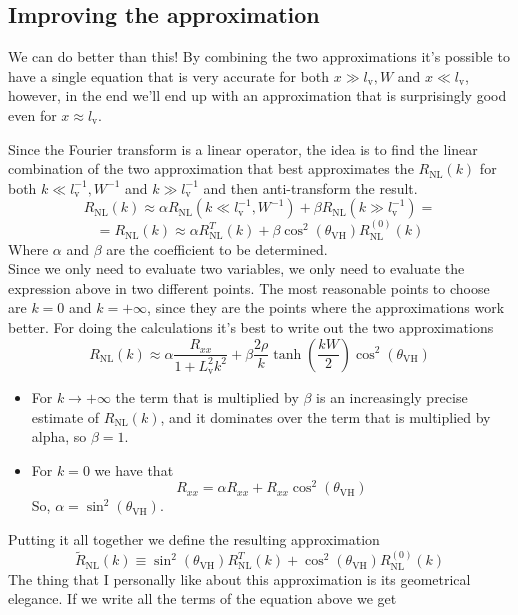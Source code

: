 \subsection{Improving the approximation}
We can do better than this! By combining the two approximations it's possible to have a single equation that is very accurate for both $x\gg l_\textrm{v},W$ and $x\ll l_\textrm{v}$, however, in the end we'll end up with an approximation that is surprisingly good even for  $x\approx l_\textrm{v}$.

Since the Fourier transform is a linear operator, the idea is to find the linear combination of the two approximation that best approximates the $R_{\textrm{NL}}(k)$ for both $k\ll l_\textrm{v}^{-1},W^{-1}$ and $k\gg l_\textrm{v}^{-1}$ and then anti-transform the result.
\[
    R_{\textrm{NL}}(k)\approx \alpha R_{\textrm{NL}}(k\ll l_\textrm{v}^{-1},W^{-1}) +\beta R_{\textrm{NL}}(k\gg l_\textrm{v}^{-1})=
\]
\[
    =R_{\textrm{NL}}(k)\approx \alpha R_{\textrm{NL}}^T(k) +\beta\cos^2(\theta_{\textrm{VH}}) R_{\textrm{NL}}^{(0)}(k)      
\]
Where $\alpha$ and $\beta$ are the coefficient to be determined.\\
Since we only need to evaluate two variables, we only need to evaluate the expression above in two different points. The most reasonable points to choose are $k=0$ and $k=+\infty$, since they are the points where the approximations work better. For doing the calculations it's best to write out the two approximations 
\[
    R_{\textrm{NL}}(k)\approx 
    \alpha \frac {R_{xx}}{1+L_\textrm{v}^2k^2}+
    \beta\frac {2\rho}{k}\tanh\left(\frac{kW}2\right)\cos^2(\theta_{\textrm{VH}})
\]
\begin{itemize}
    \item For $k\to +\infty$ the term that is multiplied by $\beta$ is an increasingly precise estimate of $R_{\textrm{NL}}(k)$, and it dominates over the term that is multiplied by alpha, so $\beta=1$.
    \item For $k=0$ we have that
    \[
        R_{xx}=\alpha R_{xx} +  R_{xx}\cos^2(\theta_{\textrm{VH}})   
    \]
    So, $\alpha=\sin^2(\theta_{\textrm{VH}})$. 
\end{itemize}
Putting it all together we define the resulting approximation
\begin{equation}
    \boxed{
        \tilde R_{\textrm{NL}}(k)\equiv
        \sin^2(\theta_{\textrm{VH}})R_{\textrm{NL}}^{T}(k)+
        \cos^2(\theta_{\textrm{VH}})R_{\textrm{NL}}^{(0)}(k)
    }
\end{equation}
The thing that I personally like about this approximation is its geometrical elegance. If we write all the terms of the equation above we get
